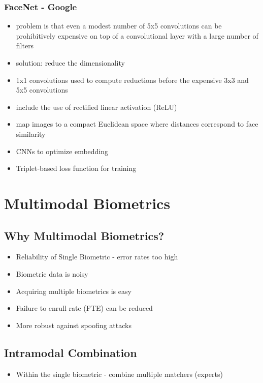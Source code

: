\documentclass[paper=a4, fontsize=11pt]{scrartcl} %
\numberwithin{equation}{section} %
\numberwithin{figure}{section} %
\numberwithin{table}{section} %
\begin{document}
\subsubsection{FaceNet - Google}

\begin{itemize}
\item problem is that even a modest number of 5x5 convolutions can be prohibitively expensive on top of a convolutional layer with a large number of filters
\item solution: reduce the dimensionality
\item 1x1 convolutions used to compute reductions before the expensive 3x3 and 5x5 convolutions
\item include the use of rectified linear activation (ReLU)
\item map images to a compact Euclidean space where distances correspond to face similarity
\item CNNs to optimize embedding
\item Triplet-based loss function for training
\end{itemize}

\section{Multimodal Biometrics}

\subsection{Why Multimodal Biometrics?}

\begin{itemize}
\item Reliability of Single Biometric - error rates too high
\item Biometric data is noisy
\item Acquiring multiple biometrics is easy
\item Failure to enrull rate (FTE) can be reduced
\item More robust against spoofing attacks
\end{itemize}

\subsection{Intramodal Combination}

\begin{itemize}
\item Within the single biometric - combine multiple matchers (experts)
\end{itemize}
\end{document}
